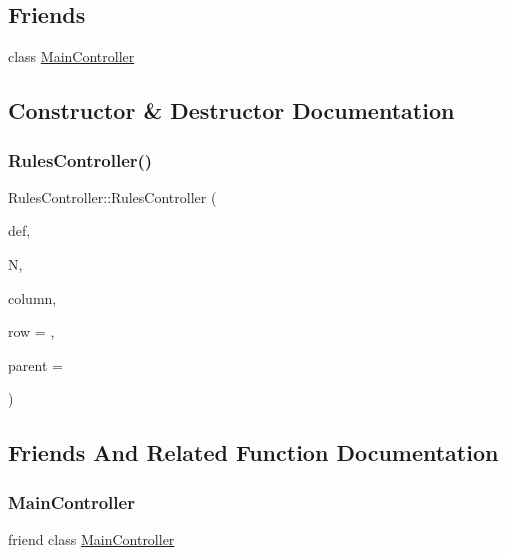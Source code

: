 \subsection*{Friends}
\begin{DoxyCompactItemize}
\item 
class \mbox{\hyperlink{class_rules_controller_a154f5ffe46dc74c6c94311b4cc3927ae}{Main\+Controller}}
\end{DoxyCompactItemize}


\subsection{Constructor \& Destructor Documentation}
\mbox{\label{class_rules_controller_a91f872c80e266517c4fd12674b477996}} 
\subsubsection{\texorpdfstring{Rules\+Controller()}{RulesController()}}
{\footnotesize\ttfamily Rules\+Controller\+::\+Rules\+Controller (\begin{DoxyParamCaption}\item[{char}]{def,  }\item[{int}]{N,  }\item[{int}]{column,  }\item[{int}]{row = {},  }\item[{Q\+Widget $\ast$}]{parent = {} }\end{DoxyParamCaption})}



\subsection{Friends And Related Function Documentation}
\mbox{\label{class_rules_controller_a154f5ffe46dc74c6c94311b4cc3927ae}} 
\subsubsection{\texorpdfstring{Main\+Controller}{MainController}}
{\footnotesize\ttfamily friend class \mbox{\hyperlink{class_main_controller}{Main\+Controller}}\hspace{0.3cm}{\ttfamily [friend]}}



